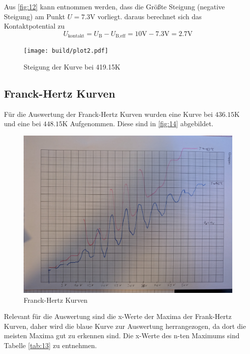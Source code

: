 \noindent Aus \autoref{fig:12} kann entnommen werden, dass die Größte Steigung (negative Steigung) am Punkt $U = 7.3\unit{\volt}$ vorliegt. daraus 
berechnet sich das Kontaktpotential zu  
\begin{equation}
  U_\text{kontakt} = U_\text{B} - U_\text{B,eff} = 10 \unit{\volt} - 7.3 \unit{\volt} = 2.7 \unit{\volt}
\end{equation}

\begin{figure}[H]
  \centering
  \texttt{[image: build/plot2.pdf]}
  \caption{Steigung der Kurve bei 419.15\unit{\kelvin}}
  \label{fig:13}
\end{figure}

\subsection{Franck-Hertz Kurven}
Für die Auswertung der Franck-Hertz Kurven wurden eine Kurve bei $436.15\unit{\kelvin}$ und eine bei $448.15\unit{\kelvin}$
Aufgenommen. Diese sind in \autoref{fig:14} abgebildet.
\begin{figure}[H]
  \centering
  \includegraphics[width=\linewidth]{Bilder/3.jpg}
  \caption{Franck-Hertz Kurven}
  \label{fig:14}
\end{figure}
Relevant für die Auswertung sind die x-Werte der Maxima der Frank-Hertz Kurven, daher wird die blaue Kurve zur Auswertung herrangezogen, 
da dort die meisten Maxima gut zu erkennen sind. Die x-Werte des n-ten Maximums sind Tabelle \autoref{tab:13} zu entnehmen. 
